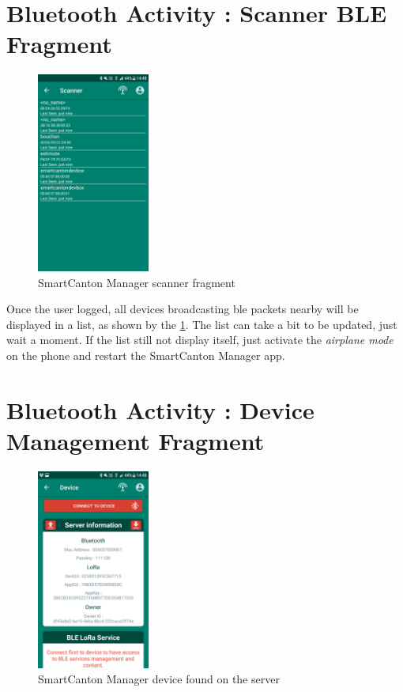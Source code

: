 \section{Bluetooth Activity : Scanner BLE Fragment}
\begin{figure}[ht!]
    \centering
    \includegraphics[width=0.33\textwidth]{Figures/Appendixes/Android/bluetooth_scanner_frag.png}
    \caption{SmartCanton Manager scanner fragment}
    \label{fig_apdx-bluetooth_scanner_frag}
\end{figure}

Once the user logged, all devices broadcasting ble packets nearby will be displayed in a list, as shown by the \cref{fig_apdx-bluetooth_scanner_frag}. The list can take a bit to be updated, just wait a moment. If the list still not display itself, just activate the \textit{airplane mode} on the phone and restart the SmartCanton Manager app.




\FloatBarrier
\section{Bluetooth Activity : Device Management Fragment}
\begin{figure}[ht!]
    \centering
    \includegraphics[width=0.33\textwidth]{Figures/Appendixes/Android/ble_dev_device_found.png}
    \caption{SmartCanton Manager device found on the server}
    \label{fig_apdx-ble_dev_device_found}
\end{figure}

